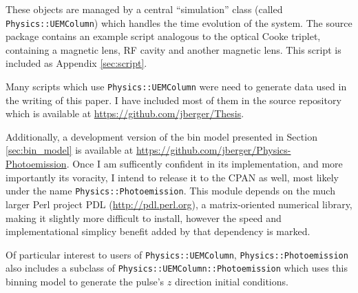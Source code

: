 These objects are managed by a central ``simulation'' class (called \verb!Physics::UEMColumn!) which handles the time evolution of the system.
The source package contains an example script analogous to the optical Cooke triplet, containing a magnetic lens, RF cavity and another magnetic lens.
This script is included as Appendix \ref{sec:script}.

Many scripts which use \verb!Physics::UEMColumn! were need to generate data used in the writing of this paper.
I have included most of them in the source repository which is available at \url{https://github.com/jberger/Thesis}.

Additionally, a development version of the bin model presented in Section \ref{sec:bin_model} is available at \url{https://github.com/jberger/Physics-Photoemission}.
Once I am sufficently confident in its implementation, and more importantly its voracity, I intend to release it to the CPAN as well, most likely under the name \verb!Physics::Photoemission!.
This module depends on the much larger Perl project PDL (\url{http://pdl.perl.org}), a matrix-oriented numerical library, making it slightly more difficult to install, however the speed and implementational simplicy benefit added by that dependency is marked.

Of particular interest to users of \verb!Physics::UEMColumn!, \verb!Physics::Photoemission! also includes a subclass of \verb!Physics::UEMColumn::Photoemission! which uses this binning model to generate the pulse's $z$ direction initial conditions.

